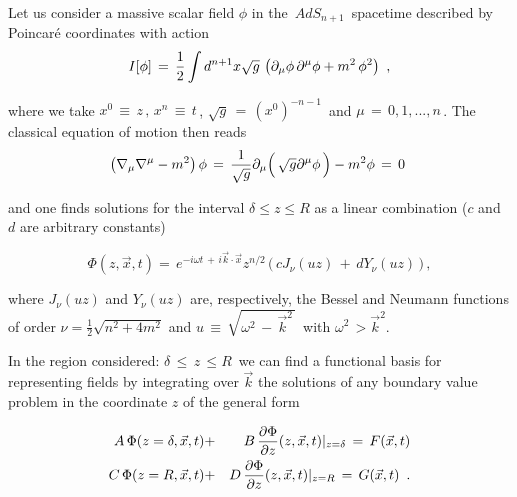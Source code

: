 \documentclass[a4paper,12pt]{article}
\begin{document}
Let us  consider a massive scalar field $\phi$ in the $\,AdS_{n+1}\,$
spacetime described by Poincar\'e coordinates with action
\begin{equation}
\label{action1}
I[\phi ]\,=\, {1\over 2} \int d^{n+1}x \sqrt{g}\,
\left(\partial_\mu \phi \, \partial^\mu \phi
+m^2\,\phi^2 \right)
\,\,,
\end{equation}
  
\noindent where we take $x^0\,\equiv\,z\,,\,x^{n}\,\equiv\,t\,$,
$\sqrt{g}\,=\,(x^0)^{-n-1}\,$ and $\mu\,=\,0,1,...,n\,$.
The classical equation of motion then reads                                                                                                                                                                                                                                                                                                                                                                                                          
\begin{equation}
\label{motion}
\left(\nabla_\mu \nabla^\mu - m^2\right) \phi\,
=\,{1\over \sqrt{g}} 
\partial_\mu 
\Big( \, \sqrt{g} \partial^\mu \phi \,\Big) 
- m^2\phi\,=\,0\,\,
\end{equation}

\noindent and one finds solutions\cite{BKL,BKLT} for the interval
$\delta \le z \le R$ as a linear combination ($c$ and $d$ are arbitrary
constants)

\begin{equation}
\label{Sol1}
\Phi(z, \vec x , t) =\, e^{-i\omega t\,+\,i\vec k \cdot \vec x} z^{n/2} 
\,\Big( \, c J_{\nu}(u z) \,+\, d Y_{\nu}(u z) \,\Big)\,,
\end{equation}

\noindent where $J_{\nu}(u z)$ and $Y_{\nu}(u z)$ are, respectively, 
the Bessel and Neumann functions of order $\nu=\frac 12\sqrt{n^2+4m^2}$ and 
$u\,\equiv \,\sqrt{ \omega^2\,-\,{\vec k}^2\,}\,$ with 
$\omega^2\,>{\vec k}^2$.

In the region considered: $\delta\,\le\,z\,\le R\,$ we can find a functional 
basis for representing fields by integrating over $\vec k $ the 
solutions of any boundary value problem in the coordinate $z$  of the 
general form

\begin{eqnarray}
\label{BC1}
A \, \Phi (z= \delta , \vec x , t) &+&
B \, {{\partial \Phi\over \partial z} (z, \vec x , t)}\vert_{z = \delta}
\,=\, F(\vec x, t)
\\
\label{BC2}
C \, \Phi (z= R , \vec x , t) &+&
D \, {{\partial \Phi\over \partial z} (z, \vec x , t)}\vert_{z = R}\,=\,
 G(\vec x, t)\,\,\,.
\end{eqnarray}
\end{document}
